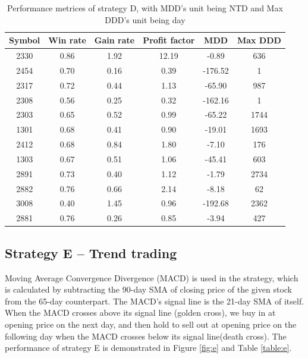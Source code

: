 \documentclass[12pt, letterpaper, oneside]{article}
\begin{document}
\begin{table}[h!]
    \centering
    \begin{tabular}{ |c|c|c|c|c|c| }
        \hline
        Symbol & Win rate & Gain rate & Profit factor & MDD & Max DDD \\ [0.5ex]
        \hline
        2330 & 0.86 & 1.92 & 12.19 & -0.89 & 636 \\
        2454 & 0.70 & 0.16 & 0.39 & -176.52 & 1 \\
        2317 & 0.72 & 0.44 & 1.13 & -65.90 & 987 \\
        2308 & 0.56 & 0.25 & 0.32 & -162.16 & 1 \\
        2303 & 0.65 & 0.52 & 0.99 & -65.22 & 1744 \\
        1301 & 0.68 & 0.41 & 0.90 & -19.01 & 1693 \\
        2412 & 0.68 & 0.84 & 1.80 & -7.10 & 176 \\
        1303 & 0.67 & 0.51 & 1.06 & -45.41 & 603 \\
        2891 & 0.73 & 0.40 & 1.12 & -1.79 & 2734 \\
        2882 & 0.76 & 0.66 & 2.14 & -8.18 & 62 \\
        3008 & 0.40 & 1.45 & 0.96 & -192.68 & 2362 \\
        2881 & 0.76 & 0.26 & 0.85 & -3.94 & 427 \\ [0.5ex]
        \hline
    \end{tabular}
    \caption{Performance metrices of strategy D, with MDD's unit being NTD and Max DDD's unit being day}
    \label{table:d}
\end{table}

\subsection{Strategy E -- Trend trading}
Moving Average Convergence Divergence (MACD) is used in the strategy, which is calculated by subtracting the 90-day SMA of closing price of the given stock from the 65-day counterpart. The MACD's signal line is the 21-day SMA of itself. When the MACD crosses above its signal line (golden cross), we buy in at opening price on the next day, and then hold to sell out at opening price on the following day when the MACD crosses below its signal line(death cross). The performance of strategy E is demonstrated in Figure \ref{fig:e} and Table \ref{table:e}.
\end{document}
